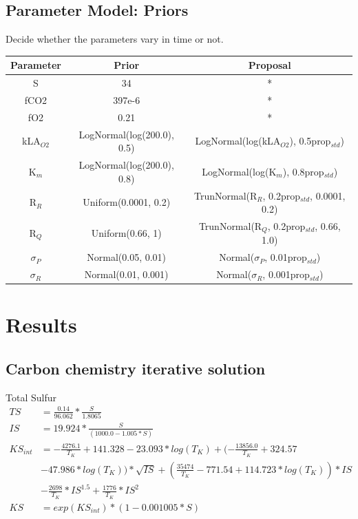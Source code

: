 \documentclass{ruthesis}
\begin{document}
\subsection{Parameter Model: Priors}
Decide whether the parameters vary in time or not.




\begin{tabular}{c | c  |  c}
	Parameter & Prior &  Proposal \\ \hline
	S  & 34 & * \\
	fCO2  & 397e-6 &  *  \\
	fO2  & 0.21 &  *  \\
	kLA$_{O2}$  & LogNormal(log(200.0), 0.5)  & LogNormal(log(kLA$_{O2}$), 0.5prop$_{std}$) \\
	K$_m$ &  LogNormal(log(200.0), 0.8)  & LogNormal(log(K$_m$), 0.8prop$_{std}$) \\
	R$_R$  & Uniform(0.0001, 0.2) &  TrunNormal(R$_R$, 0.2prop$_{std}$, 0.0001, 0.2) \\
	R$_Q$  & Uniform(0.66, 1) &  TrunNormal(R$_Q$, 0.2prop$_{std}$, 0.66, 1.0)
	 \\
	$\sigma_P$ & Normal(0.05, 0.01) & Normal($\sigma_P$, 0.01prop$_{std}$) \\
	$\sigma_R$ & Normal(0.01, 0.001) & Normal($\sigma_R$, 0.001prop$_{std}$) \\
	
\end{tabular}
\newpage


\FloatBarrier

\section{Results}


\subsection{Carbon chemistry iterative solution}

Total Sulfur
\begin{align*}
 TS     	&= \frac{0.14}{96.062}*\frac{S}{1.8065} \nonumber \\
 IS     	&= 19.924*\frac{S}{(1000.0 - 1.005*S)} \nonumber \\
 KS_{int} 	&= -\frac{4276.1}{T_K} + 141.328 - 23.093*log(T_K) + (-\frac{13856.0}{T_K} + 324.57 \nonumber\\ 			 
 			& - 47.986*log(T_K))*\sqrt{IS} + ( \frac{35474}{T_K} - 771.54  + 114.723*log(T_K))*IS \nonumber \\
 			& - \frac{2698}{T_K}*IS^{1.5} + \frac{1776}{T_K}*IS^2 \nonumber \\
 KS     	&= exp(KS_{int})*(1 - 0.001005*S) \nonumber \\
\end{align*}
\end{document}
